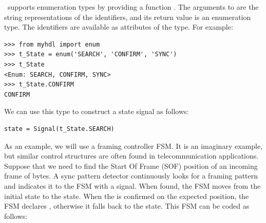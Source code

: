 \myhdl\ supports enumeration types by providing a function
.  The arguments to  are the string
representations of the identifiers, and its return value is an
enumeration type. The identifiers are available as attributes of the
type. For example:

\begin{verbatim}
>>> from myhdl import enum
>>> t_State = enum('SEARCH', 'CONFIRM', 'SYNC')
>>> t_State
<Enum: SEARCH, CONFIRM, SYNC>
>>> t_State.CONFIRM
CONFIRM
\end{verbatim}

We can use this type to construct a state signal as follows:

\begin{verbatim}
state = Signal(t_State.SEARCH)
\end{verbatim}

As an example, we will use a framing controller FSM.  It is an
imaginary example, but similar control structures are often found in
telecommunication applications. Suppose that we need to find the
Start Of Frame (SOF) position of an incoming frame of bytes.
A sync pattern detector continuously looks for a framing
pattern and indicates it to the FSM with a  signal. When
found, the FSM moves from the initial  state to the
 state. When the 
is confirmed on the expected position, the FSM declares ,
otherwise it falls back to the  state.  This FSM can be
coded as follows:


